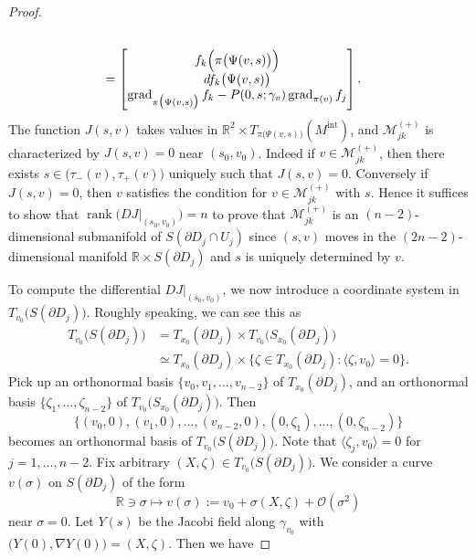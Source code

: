 \documentclass[a4paper,11pt,reqno]{amsart}
\numberwithin{equation}{section}
\theoremstyle{definition}
\theoremstyle{remark}
\begin{document}
\begin{proof}
\begin{align*}
\\
& =
  \begin{bmatrix}
  f_k\Bigl(\pi\bigl(\Psi(v,s)\bigr)\Bigr)
  \\
  df_k\bigl(\Psi(v,s)\bigr)
  \\
  \operatorname{grad}_{\pi\bigl(\Psi(v,s)\bigr)}f_k - P(0,s;\gamma_v)\operatorname{grad}_{\pi(v)}f_j 
  \end{bmatrix}.
\end{align*} 
%
%
The function $J(s,v)$ takes values in 
$\mathbb{R}^2 \times T_{\pi\bigl(\Psi(v,s)\bigr)}(M^\text{int})$, 
and $\mathcal{M}_{jk}^{(+)}$ is characterized by $J(s,v)=0$ near $(s_0,v_0)$. 
Indeed if $v \in \mathcal{M}_{jk}^{(+)}$, 
then there exists $s\in\bigl(\tau_-(v),\tau_+(v)\bigr)$ uniquely such that 
$J(s,v)=0$. Conversely if $J(s,v)=0$, then $v$ satisfies the condition for $v \in \mathcal{M}_{jk}^{(+)}$ with $s$. 
Hence it suffices to show that $\operatorname{rank}\bigl(DJ\vert_{(s_0,v_0)}\bigr)=n$ 
to prove that $\mathcal{M}_{jk}^{(+)}$ is an $(n-2)$-dimensional submanifold of $S(\partial{D_j}{\cap}U_j)$ 
since $(s,v)$ moves in the $(2n-2)$-dimensional manifold $\mathbb{R}{\times}S(\partial{D_j})$ 
and $s$ is uniquely determined by $v$. 
%
%
\par
%
%
To compute the differential $DJ\vert_{(s_0,v_0)}$, we now introduce a coordinate system in 
$T_{v_0}\bigl(S(\partial{D_j})\bigr)$. Roughly speaking, we can see this as 
%
%
\begin{align*}
  T_{v_0}\bigl(S(\partial{D_j})\bigr)
& =
  T_{x_0}(\partial{D_j})
  \times
  T_{v_0}\bigl(S_{x_0}(\partial{D_j})\bigr)
\\
& \simeq
  T_{x_0}(\partial{D_j})
  \times
  \{
  \zeta \in T_{x_0}(\partial{D_j})
  : 
  \langle{\zeta,v_0}\rangle=0
  \}.
\end{align*}
%
%
Pick up an orthonormal basis $\{v_0,v_1,\dotsc,v_{n-2}\}$ 
of $T_{x_0}(\partial{D_j})$, 
and an orthonormal basis  $\{\zeta_1,\dotsc,\zeta_{n-2}\}$ 
of $T_{v_0}\bigl(S_{x_0}(\partial{D_j})\bigr)$. 
Then 
%
%
$$
\{(v_0,0), (v_1,0), \dotsc, (v_{n-2},0), (0,\zeta_1), \dotsc, (0,\zeta_{n-2})\}
$$ 
%
%
becomes an orthonormal basis of $T_{v_0}\bigl(S(\partial{D_j})\bigr)$. 
Note that $\langle\zeta_j,v_0\rangle=0$ for $j=1,\dotsc,n-2$. 
Fix arbitrary $(X,\zeta) \in T_{v_0}\bigl(S(\partial{D_j})\bigr)$. 
We consider a curve $v(\sigma)$ on $S(\partial{D_j})$ of the form 
%
%
$$
\mathbb{R}\ni\sigma
\mapsto 
v(\sigma)
:=
v_0+\sigma(X,\zeta)+\mathcal{O}(\sigma^2)
$$
%
%
near $\sigma=0$. Let $Y(s)$ be the Jacobi field along $\gamma_{v_0}$ 
with $\bigl(Y(0),\nabla{Y(0)}\bigr)=(X,\zeta)$. Then we have 

\end{proof}
\end{document}
